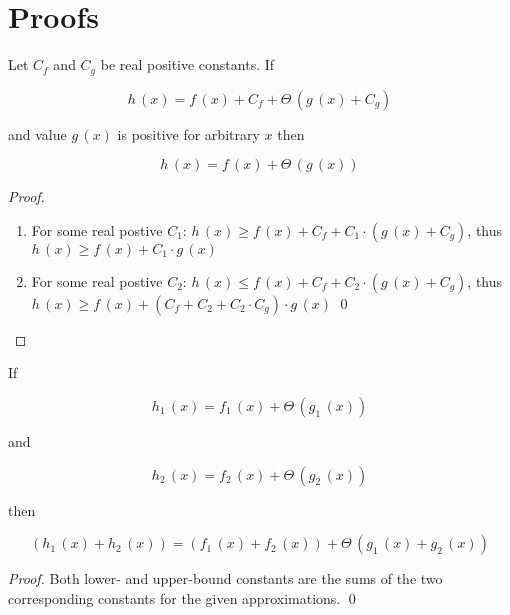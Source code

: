 \setlength{\abovecaptionskip}{0pt plus 3pt minus 2pt}
\setlength{\belowcaptionskip}{0pt plus 3pt minus 2pt}


\setlength{\topsep}{5pt}
\setlength{\partopsep}{5pt plus 0pt minus 0pt}
\setlength{\parskip}{5pt}
\setlength{\parindent}{10pt}

\clearpage
\section{Proofs}
\label{sec:proofs_appendix}

\begin{lemma}
\label{lem:theta_constant}
Let $C_f$ and $C_g$ be real positive constants. If

\[ h\,(x) = f\,(x) + C_f + \Theta\,(g\,(x) + C_g) \]

and value $g\,(x)$ is positive for arbitrary $x$ then

\[ h\,(x) = f\,(x) + \Theta\,(g\,(x)) \]

\end{lemma}
\begin{proof}
\begin{enumerate}
\item For some real postive $C_1$: $h\,(x) \ge f\,(x) + C_f + C_1 \cdot (g\,(x) + C_g)$, thus $h\,(x) \ge f\,(x) + C_1 \cdot g\,(x)$
\item For some real postive $C_2$: $h\,(x) \le f\,(x) + C_f + C_2 \cdot (g\,(x) + C_g)$, thus $h\,(x) \ge f\,(x) + (C_f + C_2 + C_2 \cdot C_g) \cdot g\,(x)$
\qed
\end{enumerate}
\end{proof}

\begin{lemma}
\label{lem:theta_sum}
If

\[ h_1\,(x) = f_1\,(x) + \Theta\,(g_1\,(x)) \]

and

\[ h_2\,(x) = f_2\,(x) + \Theta\,(g_2\,(x)) \]

then

\[ (h_1\,(x) + h_2\,(x)) = (f_1\,(x) + f_2\,(x)) + \Theta\,(g_1\,(x) + g_2\,(x)) \]

\end{lemma}
\begin{proof}
Both lower- and upper-bound constants are the sums of the two corresponding constants for the given approximations.
\qed
\end{proof}

